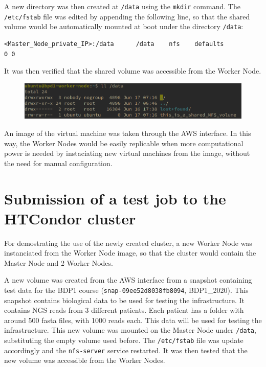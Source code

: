 \documentclass{article}
\begin{document}
A new directory was then created at \texttt{/data} using the \texttt{mkdir} command.
The \texttt{/etc/fstab} file was edited by appending the following line, so that the shared volume would be automatically mounted at boot under the directory \texttt{/data}:

\begin{lstlisting}
<Master_Node_private_IP>:/data      /data    nfs    defaults                0 0
\end{lstlisting}

It was then verified that the shared volume was accessible from the Worker Node.

\begin{figure}[!h]
	\center
	\includegraphics[width=\textwidth]{./images/nfs_works.png}
\end{figure}

An image of the virtual machine was taken through the AWS interface.
In this way, the Worker Nodes would be easily replicable when more computational power is needed by instaciating new virtual machines from the image, without the need for manual configuration.

\section{Submission of a test job to the HTCondor cluster}
For demostrating the use of the newly created cluster, a new Worker Node was instanciated from the Worker Node image, so that the cluster would contain the Master Node and 2 Worker Nodes.

A new volume was created from the AWS interface from a snapshot containing test data for the BDP1 course (\texttt{snap-09ee52d8038fb8094}, BDP1\_2020).
This snapshot contains biological data to be used for testing the infrastructure.
It contains NGS reads from 3 different patients.
Each patient has a folder with around 500 fasta files, with 1000 reads each.
This data will be used for testing the infrastructure.
This new volume was mounted on the Master Node under \texttt{/data}, substituting the empty volume used before.
The \texttt{/etc/fstab} file was update accordingly and the \texttt{nfs-server} service restarted.
It was then tested that the new volume was accessible from the Worker Nodes.
\end{document}
